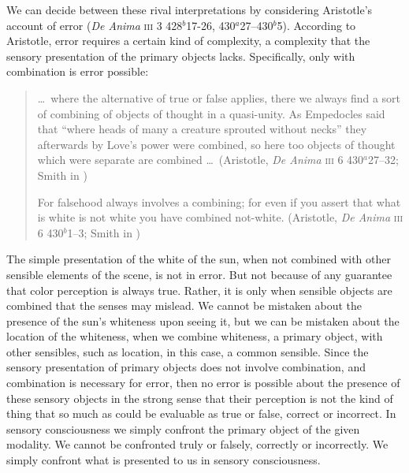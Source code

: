 We can decide between these rival interpretations by considering Aristotle's account of error (\emph{De Anima} \textsc{iii} 3 428\( ^{b} \)17-26, 430\( ^{a} \)27--430\( ^{b} \)5). According to Aristotle, error requires a certain kind of complexity, a complexity that the sensory presentation of the primary objects lacks. Specifically, only with combination is error possible:
\begin{quote}
	\ldots\ where the alternative of true or false applies, there we always find a sort of combining of objects of thought in a quasi-unity. As Empedocles said that ``where heads of many a creature sprouted without necks'' they afterwards by Love’s power were combined, so here too objects of thought which were separate are combined \ldots\ (Aristotle, \emph{De Anima} \textsc{iii} 6 430\( ^{a} \)27--32; Smith in \citealt[54]{Barnes:1984uq})
	
	For falsehood always involves a combining; for even if you assert that what is white is not white you have combined not-white. (Aristotle, \emph{De Anima} \textsc{iii} 6 430\( ^{b} \)1--3; Smith in \citealt[54]{Barnes:1984uq})
\end{quote}
The simple presentation of the white of the sun, when not combined with other sensible elements of the scene, is not in error. But not because of any guarantee that color perception is always true. Rather, it is only when sensible objects are combined that the senses may mislead. We cannot be mistaken about the presence of the sun's whiteness upon seeing it, but we can be mistaken about the location of the whiteness, when we combine whiteness, a primary object, with other sensibles, such as location, in this case, a common sensible. Since the sensory presentation of primary objects does not involve combination, and combination is necessary for error, then no error is possible about the presence of these sensory objects in the strong sense that their perception is not the kind of thing that so much as could be evaluable as true or false, correct or incorrect. In sensory consciousness we simply confront the primary object of the given modality. We cannot be confronted truly or falsely, correctly or incorrectly. We simply confront what is presented to us in sensory consciousness. 

